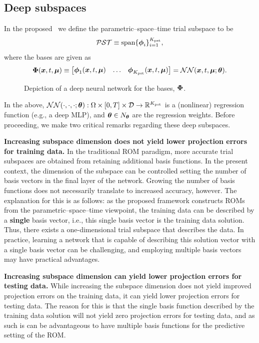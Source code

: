 \documentclass[3p,computermodern,10pt]{elsarticle}
\begin{document}
\subsection{Deep subspaces}
In the proposed \MLSubspaceNameLowercase\, we define the parametric--space--time trial subspace to be
$$\mathcal{PST} \equiv \text{span}\{\boldsymbol \phi_i\}_{i=1}^{K_{\text{pst}}},$$
where the bases are given as
$$\boldsymbol \Phi (\boldsymbol x, t,\boldsymbol \mu)\equiv \begin{bmatrix} \boldsymbol \phi_1(\boldsymbol x, t,\boldsymbol \mu) &
\hdots & 
 \boldsymbol \phi_{K_{\text{pst}}}(\boldsymbol x, t,\boldsymbol \mu) \end{bmatrix}
= \mathcal{NN}(\boldsymbol x, t,\boldsymbol \mu;\boldsymbol \theta).
$$
\begin{figure}
\begin{center}

\caption{Depiction of a deep neural network for the bases, $\boldsymbol \Phi$.}
\end{center}
\end{figure}

In the above, $\mathcal{NN}(\cdot,\cdot,\cdot;\boldsymbol \theta): \Omega \times [0,T] \times \mathcal{D} \rightarrow \mathbb{R}^{K_{\text{pst}}}$ is a (nonlinear) regression function (e.g., a deep MLP), and $\boldsymbol \theta \in  N_{\boldsymbol \theta}$ are the regression weights. Before proceeding, we make two critical remarks regarding these deep subspaces. 

\begin{remark}               
\textbf{Increasing subspace dimension does not yield lower projection errors for training data.} In the traditional ROM paradigm, more accurate trial subspaces are obtained from retaining additional basis functions. In the present context, the dimension of the subspace can be controlled setting the number of basis vectors in the final layer of the network. Growing the number of basis functions does not necessarily translate to increased accuracy, however. The explanation for this is as follows: as the proposed framework constructs ROMs from the parametric--space--time viewpoint, the training data can be described by a \textbf{single} basis vector, i.e., this single basis vector is the training data solution. Thus, there exists a one-dimensional trial subspace that describes the data. In practice, learning a network that is capable of describing this solution vector with a single basis vector can be challenging, and employing multiple basis vectors may have practical advantages.  
\end{remark}
\begin{remark}               
\textbf{Increasing subspace dimension can yield lower projection errors for testing data.} While increasing the subspace dimension does not yield improved projection errors on the training data, it can yield lower projection errors for testing data. The reason for this is that the single basis function described by the training data solution will not yield zero projection errors for testing data, and as such is can be advantageous to have multiple basis functions for the predictive setting of the ROM. 
\end{remark}
\end{document}
